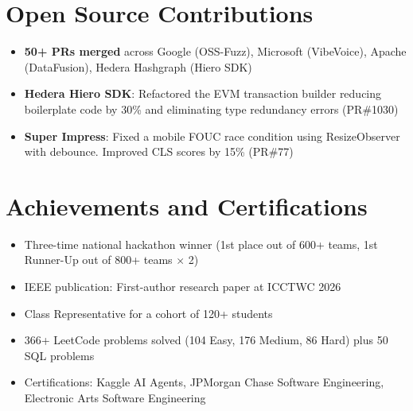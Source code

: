 \documentclass[letterpaper,10pt]{article}
\begin{document}
\section{Open Source Contributions}
\begin{itemize}[leftmargin=0.15in, label={}]
  \item\small{\textbf{50+ PRs merged} across Google (OSS-Fuzz), Microsoft (VibeVoice), Apache (DataFusion), Hedera Hashgraph (Hiero SDK)}
  \item\small{\textbf{Hedera Hiero SDK}: Refactored the EVM transaction builder reducing boilerplate code by 30\% and eliminating type redundancy errors (PR\#1030)}
  \item\small{\textbf{Super Impress}: Fixed a mobile FOUC race condition using ResizeObserver with debounce. Improved CLS scores by 15\% (PR\#77)}
\end{itemize}

\section{Achievements and Certifications}
\begin{itemize}[leftmargin=0.15in, label={}]
  \item\small{Three-time national hackathon winner (1st place out of 600+ teams, 1st Runner-Up out of 800+ teams $\times$ 2)}
  \item\small{IEEE publication: First-author research paper at ICCTWC 2026}
  \item\small{Class Representative for a cohort of 120+ students}
  \item\small{366+ LeetCode problems solved (104 Easy, 176 Medium, 86 Hard) plus 50 SQL problems}
  \item\small{Certifications: Kaggle AI Agents, JPMorgan Chase Software Engineering, Electronic Arts Software Engineering}
\end{itemize}
\end{document}

